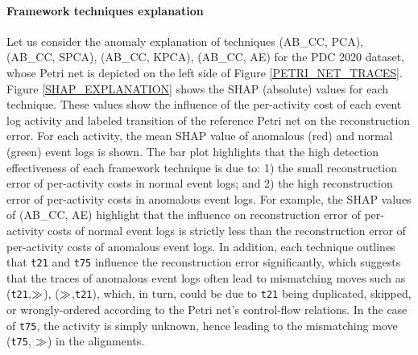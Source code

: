 \paragraph{Framework techniques explanation} Let us consider the anomaly explanation of techniques (AB\_CC, PCA), (AB\_CC, SPCA), (AB\_CC, KPCA), (AB\_CC, AE) for the PDC 2020 dataset, whose Petri net is depicted on the left side of Figure \ref{PETRI_NET_TRACES}. Figure \ref{SHAP_EXPLANATION} shows the SHAP (absolute) values for each technique. These values show the influence of the per-activity cost of each event log activity and labeled transition of the reference Petri net on the reconstruction error. For each activity, the mean SHAP value of anomalous (red) and normal (green) event logs is shown. The bar plot highlights that the high detection effectiveness of each framework technique is due to: 1) the small reconstruction error of per-activity costs in normal event logs; and 2) the high reconstruction error of per-activity costs in anomalous event logs. For example, the SHAP values of (AB\_CC, AE) highlight that the influence on reconstruction error of per-activity costs of normal event logs is strictly less than the reconstruction error of per-activity costs of anomalous event logs. In addition, each technique outlines that \texttt{t21} and \texttt{t75} influence the reconstruction error significantly, which suggests that the traces of anomalous event logs often lead to mismatching moves such as (\texttt{t21},$\gg$), ($\gg$,\texttt{t21}), which, in turn, could be due to \texttt{t21} being duplicated, skipped, or wrongly-ordered according to the Petri net's control-flow relations. In the case of \texttt{t75}, the activity is simply unknown, hence leading to the mismatching move (\texttt{t75}, $\gg$) in the alignments.

